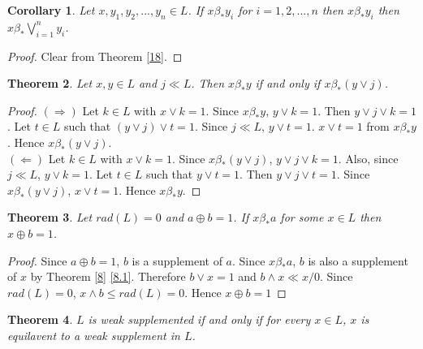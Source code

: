 \documentclass[a4paper,12pt]{article}
\newtheorem{theorem}{Theorem}[section]
\newtheorem{corollary}[theorem]{Corollary}
\numberwithin{equation}{section}
\begin{document}
\begin{corollary}\label{19}
  Let $ x, y_1, y_2,...,y_n \in L $. If $ x \beta_* y_i $ for $ i=1,2,...,n $ then  
  $ x \beta_* y_i $ then $ \displaystyle x \beta_* \bigvee_{i=1}^n y_i $.
\end{corollary}
\begin{proof}
  Clear from Theorem \ref{18}.
\end{proof}

\begin{theorem}\label{20}
  Let $ x,y \in L $ and $ j \ll L $. Then $ x \beta_* y $ if and only if $ x \beta_* ( y \vee j ) $.
\end{theorem}

\begin{proof}
  $ ( \Rightarrow ) $ 
  Let $ k \in L $ with $ x \vee k = 1 $. Since $ x \beta_* y $, $ y \vee k = 1 $. Then $ y \vee j \vee k = 1 $. 
  Let $ t \in L $ such that $ ( y \vee j ) \vee t = 1 $. Since $ j \ll L $, $ y \vee t = 1 $. $ x \vee t = 1 $ from $ x \beta_* y $. 
  Hence $ x \beta_* ( y \vee j ) $. \\
  $( \Leftarrow ) $ 
  Let $ k \in L $ with $ x \vee k = 1 $. Since $ x \beta_* ( y \vee j ) $, $ y \vee j \vee k = 1 $. Also, since $ j \ll L $, $ y \vee k = 1 $. 
  Let $ t \in L $ such that $ y \vee t = 1 $. Then $ y \vee j \vee t = 1 $. Since $ x \beta_* ( y \vee j ) $, $ x \vee t = 1 $. Hence $ x \beta_* y $.

\end{proof}

\begin{theorem}\label{21}
  Let $ rad(L)=0 $ and $ a \oplus b = 1 $. If $ x \beta_* a $ for some $ x \in L $ then $ x \oplus b = 1 $. 
\end{theorem}
\begin{proof}
  Since $ a \oplus b = 1 $, $ b $ is a supplement of $ a $. 
  Since $ x \beta_* a $, $ b $ is also a supplement of $ x $ by Theorem \ref{8} \ref{8.1}. 
  Therefore $ b \vee x = 1 $ and 
  $ b \wedge x \ll x/0 $. Since $ rad(L)=0 $, $ x \wedge b \leq rad(L) = 0 $. Hence $ x \oplus b = 1 $
\end{proof}

\begin{theorem}
  $ L $ is weak supplemented if and only if for every $ x \in L $, $ x $ is equilavent to a weak supplement in $ L $.
\end{theorem}
\end{document}
